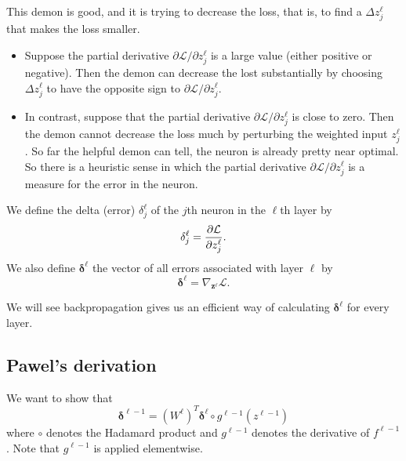 \documentclass[12pt]{article}
\newcommand{\z}{\boldsymbol{z}}
\newcommand{\bdelta}{\boldsymbol{\delta}}
\newcommand{\cL}{\mathcal{L}}
\begin{document}
This demon is good, and it is trying to decrease the loss, that is, to find a $\Delta z^\ell_j$ that makes the loss smaller. 
\begin{itemize}
\item Suppose the partial derivative ${\partial \cL / \partial z^\ell_j}$ is a large value (either positive or negative). Then the demon can decrease the lost substantially by choosing $\Delta z_j^\ell$ to have the opposite sign to ${\partial \cL / \partial z^\ell_j}$.
\item In contrast, suppose that the partial derivative ${\partial \cL / \partial z^\ell_j}$ is close to zero. Then the demon cannot decrease the loss much by perturbing the weighted input $z^\ell_j$. So far the helpful demon can tell, the neuron is already pretty near optimal. So there is a heuristic sense in which the partial derivative ${\partial \cL / \partial z^\ell_j}$ is a measure for the error in the neuron.
\end{itemize}

We define the delta (error) $\delta^\ell_j$ of the $j$th neuron in the $\ell$th layer by
\begin{equation}
\delta^\ell_j = {\partial \cL \over \partial z^\ell_j}.
\end{equation}
We also define $\bdelta^\ell$ the vector of all errors associated with layer $\ell$ by
\begin{equation}
\bdelta^\ell = \nabla_{\z^\ell} \cL.
\end{equation}

We will see backpropagation gives us an efficient way of calculating $\bdelta^\ell$ for every layer. 

\subsection{Pawel's derivation}

We want to show that 
\begin{equation}
\bdelta^{\ell-1} = (W^{\ell})^T \bdelta^\ell \circ g^{\ell-1}(z^{\ell-1})
\end{equation}
where $\circ$ denotes the Hadamard product and $g^{\ell-1}$ denotes the derivative of $f^{\ell-1}$. Note that $g^{\ell-1}$ is applied elementwise.
\end{document}

